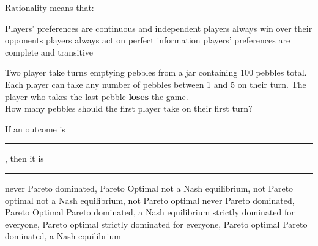 \begin{question}
  Rationality means that:
  \begin{tasks}
    \task Players' preferences are continuous and independent
    \task players always win over their opponents
    \task players always act on perfect information
    \task \correct players' preferences are complete and transitive
  \end{tasks}
\end{question}

\begin{question}
  Two player take turns emptying pebbles from a jar containing 100 pebbles total.
  Each player can take any number of pebbles between 1 and 5 on their turn.
  The player who takes the last pebble \textbf{loses} the game. \\
  How many pebbles should the first player take on their first turn?
  \begin{tasks}
    \task {}
    \task {}
    \task {}
    \task {} 
    \task {}
  \end{tasks}
\end{question}

\begin{question}
  If an outcome is \rule{1cm}{0.15mm}, 
  then it is \rule{1cm}{0.15mm}
  \begin{tasks}
    \task \vary
    {\correct never Pareto dominated, Pareto Optimal}
    {not a Nash equilibrium, not Pareto optimal} 
    \task \vary
    {not a Nash equilibrium, not Pareto optimal} 
    {\correct never Pareto dominated, Pareto Optimal}
    \task \vary
    {Pareto dominated, a Nash equilibrium}
    {strictly dominated for everyone, Pareto optimal}
    \task \vary
    {strictly dominated for everyone, Pareto optimal}
    {Pareto dominated, a Nash equilibrium}
  \end{tasks}
\end{question}

